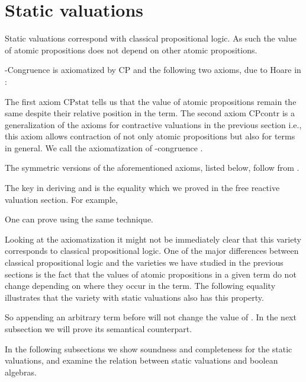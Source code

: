 \documentclass[a4paper,twoside,openright]{report}
\newcommand{\CPcontr}{\ensuremath{\mathrm{CPcontr}}}
\newcommand{\CPstat}{\ensuremath{\mathrm{CPstat}}}
\begin{document}
\section{Static valuations}
Static valuations correspond with classical propositional logic. As such the value of atomic propositions does not depend on other atomic propositions.

-Congruence is axiomatized by CP and the following two axioms, due to Hoare in \cite{hoare}:

The first axiom \CPstat{} tells us that the value of atomic propositions remain the same despite their relative position in the term. The second axiom \CPcontr{} is a generalization of the axioms for contractive valuations in the previous section i.e., this axiom allows contraction of not only atomic propositions but also for terms in general. We call the axiomatization of -congruence .

The symmetric versions of the aforementioned axioms, listed below, follow from .

The key in deriving  and  is the equality  which we proved in the free reactive valuation section. For example,

One can prove  using the same technique.

Looking at the axiomatization it might not be immediately clear that this variety corresponds to classical propositional logic. One of the major differences between classical propositional logic and the varieties we have studied in the previous sections is the fact that the values of atomic propositions in a given term do not change depending on where they occur in the term. The following equality illustrates that the variety with static valuations also has this property.

So appending an arbitrary term before  will not change the value of . In the next subsection we will prove its semantical counterpart.

In the following subsections we show soundness and completeness for the static valuations, and examine the relation between static valuations and boolean algebras.
\end{document}
